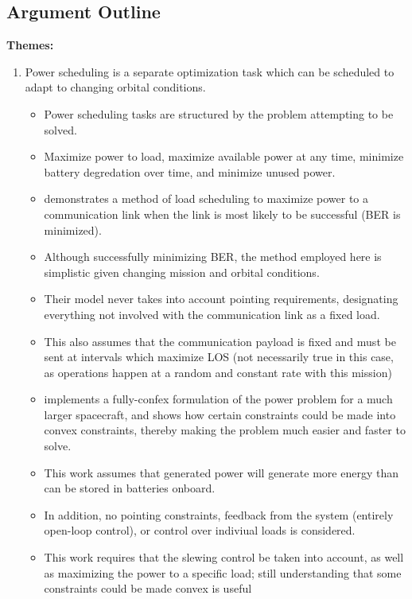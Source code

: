 \subsection{Argument Outline} 
\textbf{Themes:}
\begin{enumerate}
    \item Power scheduling is a separate optimization task which can be scheduled to adapt to changing orbital conditions.
    \begin{itemize}
        \item Power scheduling tasks are structured by the problem attempting to be solved.
        \item Maximize power to load, maximize available power at any time, minimize battery degredation over time, and minimize unused power.
        \item \cite{husseinOptimizedLoadSchedulingAlgorithm2023} demonstrates a method of load scheduling to maximize power to a communication link when the link is most likely to be successful (BER is minimized). 
        \item Although successfully minimizing BER, the method employed here is simplistic given changing mission and orbital conditions. 
        \item Their model never takes into account pointing requirements, designating everything not involved with the communication link as a fixed load. 
        \item This also assumes that the communication payload is fixed and must be sent at intervals which maximize LOS (not necessarily true in this case, as operations happen at a random and constant rate with this mission)
        \item \cite{doff-sottaSpacecraftEnergyManagement2022} implements a fully-confex formulation of the power problem for a much larger spacecraft, and shows how certain constraints could be made into convex constraints, thereby making the problem much easier and faster to solve.
        \item This work assumes that generated power will generate more energy than can be stored in batteries onboard.  
        \item In addition, no pointing constraints, feedback from the system (entirely open-loop control), or control over indiviual loads is considered.
        \item This work requires that the slewing control be taken into account, as well as maximizing the power to a specific load; still understanding that some constraints could be made convex is useful

\end{itemize}
\end{enumerate}
